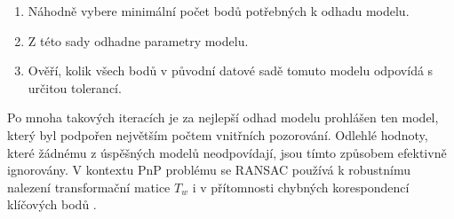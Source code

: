 \begin{enumerate}
\item Náhodně vybere minimální počet bodů potřebných k odhadu modelu.
\item Z této sady odhadne parametry modelu.
\item Ověří, kolik všech bodů v původní datové sadě tomuto modelu odpovídá s určitou tolerancí.
\end{enumerate}

Po mnoha takových iteracích je za nejlepší odhad modelu prohlášen ten model, který byl podpořen největším počtem vnitřních pozorování. Odlehlé hodnoty, které žádnému z úspěšných modelů neodpovídají, jsou tímto způsobem efektivně ignorovány. V kontextu PnP problému se RANSAC používá k robustnímu nalezení transformační matice $T_w$ i v přítomnosti chybných korespondencí klíčových bodů \cite{pnpransaclmalg}.